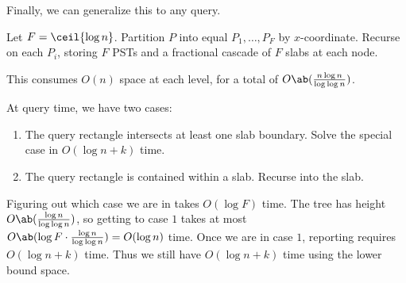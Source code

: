Finally, we can generalize this to any query.
\begin{solution}
    Let $F = \ceil{\log n}$.
    Partition $P$ into equal $P_1, \dots, P_F$ by $x$-coordinate.
    Recurse on each $P_i$,
    storing $F$ PSTs and a fractional cascade of $F$ slabs at each node.

    This consumes $O(n)$ space at each level, for a total of
    $O\ab(\frac{n \log n}{\log \log n})$.

    At query time, we have two cases:
    \begin{enumerate}[label=(Case \arabic*)]
        \item The query rectangle intersects at least one slab boundary.
            Solve the special case in $O(\log n + k)$ time.
        \item The query rectangle is contained within a slab.
            Recurse into the slab.
    \end{enumerate}
    Figuring out which case we are in takes $O(\log F)$ time.
    The tree has height $O\ab(\frac{\log n}{\log \log n})$,
    so getting to case $1$ takes at most
    $O\ab(\log F \cdot \frac{\log n}{\log \log n}) = O(\log n)$ time.
    Once we are in case $1$, reporting requires $O(\log n + k)$ time.
    Thus we still have $O(\log n + k)$ time using the lower bound space.
\end{solution}
